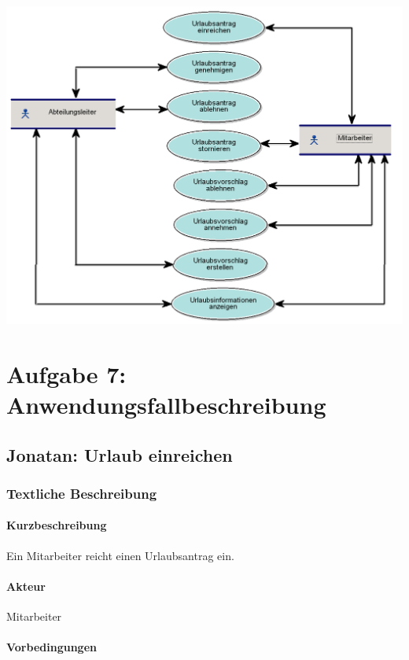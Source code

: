 \begin{center}
	\includegraphics[width=0.9\linewidth]{UrlaubPlanen_AWF.PNG}
\end{center}

\chapter*{Aufgabe 7: Anwendungsfallbeschreibung}
\setcounter{section}{0}
\addtocounter{chapter}{1}

\section{Jonatan: Urlaub einreichen}

\subsection{Textliche Beschreibung}

\subsubsection{Kurzbeschreibung}

Ein Mitarbeiter reicht einen Urlaubsantrag ein.

\subsubsection{Akteur}

Mitarbeiter

\subsubsection{Vorbedingungen}

